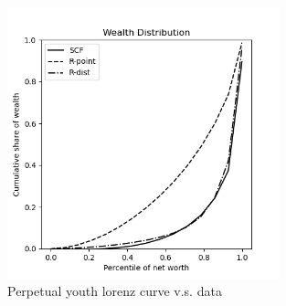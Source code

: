  \hypertarget{PYUnif}{}
 \begin{figure}[H]
   \centering
    \includegraphics[width=0.7\textwidth]{./Figures/PYUnif.png}
    \caption{Perpetual youth lorenz curve v.s. data}
    \label{fig:PYUnif}
  \end{figure}
